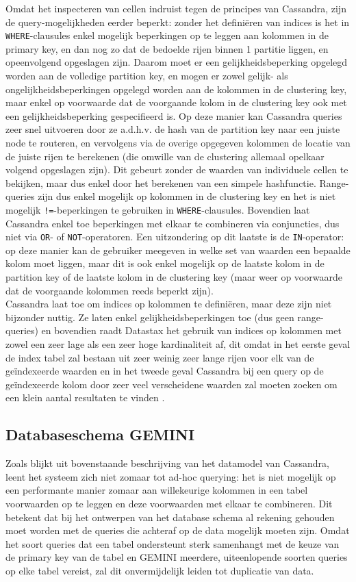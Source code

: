 Omdat het inspecteren van cellen indruist tegen de principes van Cassandra, zijn de query-mogelijkheden eerder beperkt: zonder het defini\"eren van indices is het in \texttt{WHERE}-clausules enkel mogelijk beperkingen op te leggen aan kolommen in de primary key, en dan nog zo dat de bedoelde rijen binnen 1 partitie liggen, en opeenvolgend opgeslagen zijn. Daarom moet er een gelijkheidsbeperking opgelegd worden aan de volledige partition key, en mogen er zowel gelijk- als ongelijkheidsbeperkingen opgelegd worden aan de kolommen in de clustering key, maar enkel op voorwaarde dat de voorgaande kolom in de clustering key ook met een gelijkheidsbeperking gespecifieerd is. Op deze manier kan Cassandra queries zeer snel uitvoeren door ze a.d.h.v. de hash van de partition key naar een juiste node te routeren, en vervolgens via de overige opgegeven kolommen de locatie van de juiste rijen te berekenen (die omwille van de clustering allemaal opelkaar volgend opgeslagen zijn). Dit gebeurt zonder de waarden van individuele cellen te bekijken, maar dus enkel door het berekenen van een simpele hashfunctie. Range-queries zijn dus enkel mogelijk op kolommen in de clustering key en het is niet mogelijk \texttt{!=}-beperkingen te gebruiken in \texttt{WHERE}-clausules. Bovendien laat Cassandra enkel toe beperkingen met elkaar te combineren via conjuncties, dus niet via \texttt{OR}- of \texttt{NOT}-operatoren. Een uitzondering op dit laatste is de \texttt{IN}-operator: op deze manier kan de gebruiker meegeven in welke set van waarden een bepaalde kolom moet liggen, maar dit is ook enkel mogelijk op de laatste kolom in de partition key of de laatste kolom in de clustering key (maar weer op voorwaarde dat de voorgaande kolommen reeds beperkt zijn).\\
Cassandra laat toe om indices op kolommen te defini\"eren, maar deze zijn niet bijzonder nuttig. Ze laten enkel gelijkheidsbeperkingen toe (dus geen range-queries) en bovendien raadt Datastax het gebruik van indices op kolommen met zowel een zeer lage als een zeer hoge kardinaliteit af, dit omdat in het eerste geval de index tabel zal bestaan uit zeer weinig zeer lange rijen voor elk van de ge\"indexeerde waarden en in het tweede geval Cassandra bij een query op de ge\"indexeerde kolom door zeer veel verscheidene waarden zal moeten zoeken om een klein aantal resultaten te vinden \cite{when_to_use_index}.

\subsection{Databaseschema GEMINI}
Zoals blijkt uit bovenstaande beschrijving van het datamodel van Cassandra, leent het systeem zich niet zomaar tot ad-hoc querying: het is niet mogelijk op een performante manier zomaar aan willekeurige kolommen in een tabel voorwaarden op te leggen en deze voorwaarden met elkaar te combineren. Dit betekent dat bij het ontwerpen van het database schema al rekening gehouden moet worden met de queries die achteraf op de data mogelijk moeten zijn. Omdat het soort queries dat een tabel ondersteunt sterk samenhangt met de keuze van de primary key van de tabel en GEMINI meerdere, uiteenlopende soorten queries op elke tabel vereist, zal dit onvermijdelijk leiden tot duplicatie van data.

